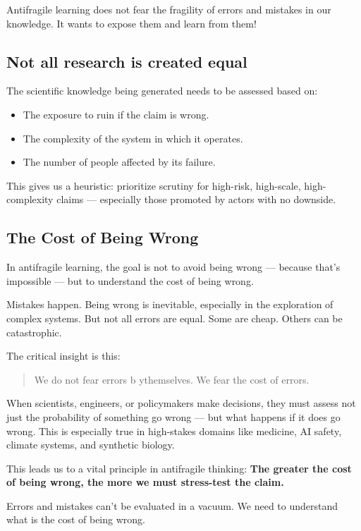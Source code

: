 \documentclass{article}
\begin{document}
Antifragile learning does not fear the fragility of errors and mistakes in our knowledge. It wants to expose them and learn from them!

\subsection{Not all research is created equal}

The scientific knowledge being generated needs to be assessed based on:
\begin{itemize}
	\item The exposure to ruin if the claim is wrong.
	\item The complexity of the system in which it operates.
	\item The number of people affected by its failure.
\end{itemize}

This gives us a heuristic: prioritize scrutiny for high-risk, high-scale, high-complexity claims — especially those promoted by actors with no downside.

\subsection{The Cost of Being Wrong}

In antifragile learning, the goal is not to avoid being wrong — because that’s impossible — but to understand the cost of being wrong.

Mistakes happen. Being wrong is inevitable, especially in the exploration of complex systems. But not all errors are equal. Some are cheap. Others can be catastrophic. 

The critical insight is this:
\begin{quote}
	We do not fear errors b ythemselves. We fear the cost of errors.
\end{quote}

When scientists, engineers, or policymakers make decisions, they must assess not just the probability of something go wrong — but what happens if 
it does go wrong. This is especially true in high-stakes domains like medicine, AI safety, climate systems, and synthetic biology.

This leads us to a vital principle in antifragile thinking: \textbf{The greater the cost of being wrong, the more we must stress-test the claim.}

Errors and mistakes can't be evaluated in a vacuum. We need to understand what is the cost of being wrong. 
\end{document}
